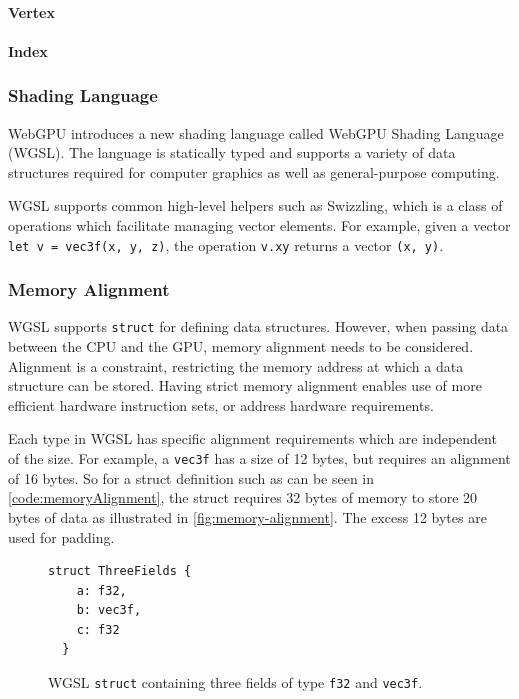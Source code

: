 \paragraph{Vertex}

\paragraph{Index}

\subsubsection{Shading Language}

WebGPU introduces a new shading language called WebGPU Shading Language (\gls{WGSL}). The language is statically typed and supports a variety of data structures required for computer graphics as well as general-purpose computing.

\gls{WGSL} supports common high-level helpers such as Swizzling, which is a class of operations which facilitate managing vector elements. For example, given a vector \verb|let v = vec3f(x, y, z)|, the operation \verb|v.xy| returns a vector \verb|(x, y)|.

\subsubsection{Memory Alignment}
\label{ch:memoryAlignmentTheory}

\gls{WGSL} supports \verb|struct| for defining data structures. However, when passing data between the CPU and the GPU, memory alignment needs to be considered. Alignment is a constraint, restricting the memory address at which a data structure can be stored. Having strict memory alignment enables use of more efficient hardware instruction sets, or address hardware requirements.

Each type in \gls{WGSL} has specific alignment requirements which are independent of the size. For example, a \verb|vec3f| has a size of 12 bytes, but requires an alignment of 16 bytes. So for a struct definition such as can be seen in \autoref{code:memoryAlignment}, the struct requires 32 bytes of memory to store 20 bytes of data as illustrated in \autoref{fig:memory-alignment}. The excess 12 bytes are used for padding.

\begin{figure}[H]
  \begin{lstlisting}[style=wgsl]
  struct ThreeFields {
    a: f32,
    b: vec3f,
    c: f32
  }
  \end{lstlisting}
  \caption{\gls{WGSL} \texttt{struct} containing three fields of type \texttt{f32} and \texttt{vec3f}.}
  \label{code:memoryAlignment}
  \end{figure}

